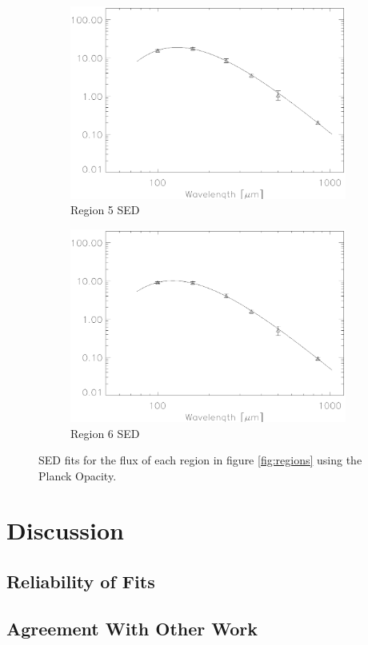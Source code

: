 \begin{figure}
  \begin{subfigure}[t]{.48\textwidth}
    \centering
    \includegraphics[width=1.\textwidth]{sed_imgs/region_5beta_20_SED_fit.eps}
    \caption{Region 5 SED}
  \end{subfigure}
  \quad
  \begin{subfigure}[t]{.48\textwidth}
    \centering
    \includegraphics[width=1.\textwidth]{sed_imgs/region_6beta_195_SED_fit.eps}
    \caption{Region 6 SED}
  \end{subfigure}
  \caption[Region Flux SED Fits]{SED fits for the flux of each region in figure \ref{fig:regions} using the Planck Opacity.}
  \label{fig:SED_region}
\end{figure}
  
  
  
\section{Discussion}
\subsection{Reliability of Fits}
\subsection{Agreement With Other Work}
